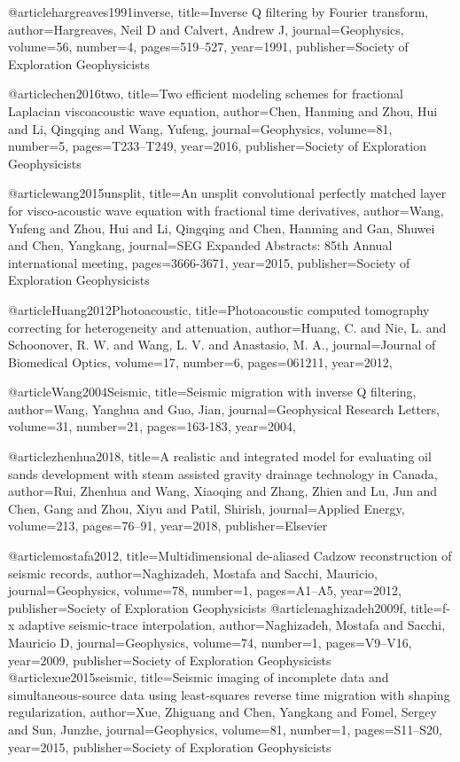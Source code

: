 @article{hargreaves1991inverse,
  title={Inverse {Q} filtering by {F}ourier transform},
  author={Hargreaves, Neil D and Calvert, Andrew J},
  journal={Geophysics},
  volume={56},
  number={4},
  pages={519--527},
  year={1991},
  publisher={Society of Exploration Geophysicists}
}

@article{chen2016two,
  title={Two efficient modeling schemes for fractional {L}aplacian viscoacoustic wave equation},
  author={Chen, Hanming and Zhou, Hui and Li, Qingqing and Wang, Yufeng},
  journal={Geophysics},
  volume={81},
  number={5},
  pages={T233--T249},
  year={2016},
  publisher={Society of Exploration Geophysicists}
}

@article{wang2015unsplit,
  title={An unsplit convolutional perfectly matched layer for visco-acoustic wave equation with fractional time derivatives},
  author={Wang, Yufeng and Zhou, Hui and Li, Qingqing and Chen, Hanming and Gan, Shuwei and Chen, Yangkang},
  journal={SEG Expanded Abstracts: 85th Annual international meeting},
  pages={3666-3671},
  year={2015},
  publisher={Society of Exploration Geophysicists}
}

@article{Huang2012Photoacoustic,
  title={Photoacoustic computed tomography correcting for heterogeneity and attenuation},
  author={Huang, C. and Nie, L. and Schoonover, R. W. and Wang, L. V. and Anastasio, M. A.},
  journal={Journal of Biomedical Optics},
  volume={17},
  number={6},
  pages={061211},
  year={2012},
}

@article{Wang2004Seismic,
  title={Seismic migration with inverse {Q} filtering},
  author={Wang, Yanghua and Guo, Jian},
  journal={Geophysical Research Letters},
  volume={31},
  number={21},
  pages={163-183},
  year={2004},
}

@article{zhenhua2018,
  title={A realistic and integrated model for evaluating oil sands development with steam assisted gravity drainage technology in Canada},
  author={Rui, Zhenhua and Wang, Xiaoqing and Zhang, Zhien and Lu, Jun and Chen, Gang and Zhou, Xiyu and Patil, Shirish},
  journal={Applied Energy},
  volume={213},
  pages={76--91},
  year={2018},
  publisher={Elsevier}
}

@article{mostafa2012,
  title={Multidimensional de-aliased Cadzow reconstruction of seismic records},
  author={Naghizadeh, Mostafa and Sacchi, Mauricio},
  journal={Geophysics},
  volume={78},
  number={1},
  pages={A1--A5},
  year={2012},
  publisher={Society of Exploration Geophysicists}
}
@article{naghizadeh2009f,
  title={f-x adaptive seismic-trace interpolation},
  author={Naghizadeh, Mostafa and Sacchi, Mauricio D},
  journal={Geophysics},
  volume={74},
  number={1},
  pages={V9--V16},
  year={2009},
  publisher={Society of Exploration Geophysicists}
}
@article{xue2015seismic,
  title={Seismic imaging of incomplete data and simultaneous-source data using least-squares reverse time migration with shaping regularization},
  author={Xue, Zhiguang and Chen, Yangkang and Fomel, Sergey and Sun, Junzhe},
  journal={Geophysics},
  volume={81},
  number={1},
  pages={S11--S20},
  year={2015},
  publisher={Society of Exploration Geophysicists}
}

